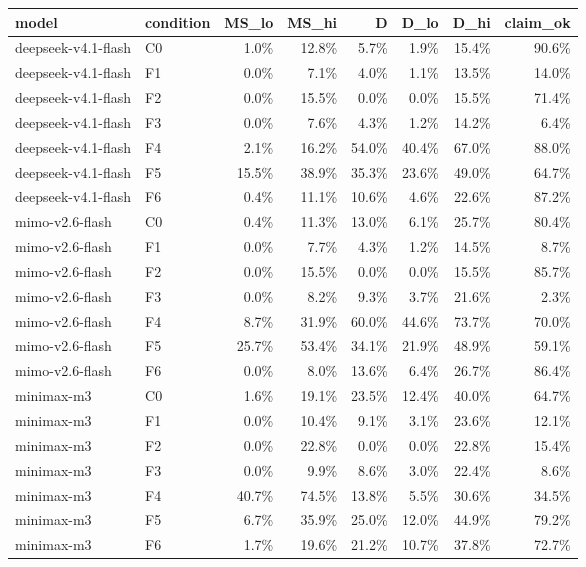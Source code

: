 \begin{tabular}{llrrrrrr}
\toprule
model & condition & MS\_lo & MS\_hi & D & D\_lo & D\_hi & claim\_ok \\
\midrule
deepseek-v4.1-flash & C0 & 1.0\% & 12.8\% & 5.7\% & 1.9\% & 15.4\% & 90.6\% \\
deepseek-v4.1-flash & F1 & 0.0\% & 7.1\% & 4.0\% & 1.1\% & 13.5\% & 14.0\% \\
deepseek-v4.1-flash & F2 & 0.0\% & 15.5\% & 0.0\% & 0.0\% & 15.5\% & 71.4\% \\
deepseek-v4.1-flash & F3 & 0.0\% & 7.6\% & 4.3\% & 1.2\% & 14.2\% & 6.4\% \\
deepseek-v4.1-flash & F4 & 2.1\% & 16.2\% & 54.0\% & 40.4\% & 67.0\% & 88.0\% \\
deepseek-v4.1-flash & F5 & 15.5\% & 38.9\% & 35.3\% & 23.6\% & 49.0\% & 64.7\% \\
deepseek-v4.1-flash & F6 & 0.4\% & 11.1\% & 10.6\% & 4.6\% & 22.6\% & 87.2\% \\
mimo-v2.6-flash & C0 & 0.4\% & 11.3\% & 13.0\% & 6.1\% & 25.7\% & 80.4\% \\
mimo-v2.6-flash & F1 & 0.0\% & 7.7\% & 4.3\% & 1.2\% & 14.5\% & 8.7\% \\
mimo-v2.6-flash & F2 & 0.0\% & 15.5\% & 0.0\% & 0.0\% & 15.5\% & 85.7\% \\
mimo-v2.6-flash & F3 & 0.0\% & 8.2\% & 9.3\% & 3.7\% & 21.6\% & 2.3\% \\
mimo-v2.6-flash & F4 & 8.7\% & 31.9\% & 60.0\% & 44.6\% & 73.7\% & 70.0\% \\
mimo-v2.6-flash & F5 & 25.7\% & 53.4\% & 34.1\% & 21.9\% & 48.9\% & 59.1\% \\
mimo-v2.6-flash & F6 & 0.0\% & 8.0\% & 13.6\% & 6.4\% & 26.7\% & 86.4\% \\
minimax-m3 & C0 & 1.6\% & 19.1\% & 23.5\% & 12.4\% & 40.0\% & 64.7\% \\
minimax-m3 & F1 & 0.0\% & 10.4\% & 9.1\% & 3.1\% & 23.6\% & 12.1\% \\
minimax-m3 & F2 & 0.0\% & 22.8\% & 0.0\% & 0.0\% & 22.8\% & 15.4\% \\
minimax-m3 & F3 & 0.0\% & 9.9\% & 8.6\% & 3.0\% & 22.4\% & 8.6\% \\
minimax-m3 & F4 & 40.7\% & 74.5\% & 13.8\% & 5.5\% & 30.6\% & 34.5\% \\
minimax-m3 & F5 & 6.7\% & 35.9\% & 25.0\% & 12.0\% & 44.9\% & 79.2\% \\
minimax-m3 & F6 & 1.7\% & 19.6\% & 21.2\% & 10.7\% & 37.8\% & 72.7\% \\

\end{tabular}
